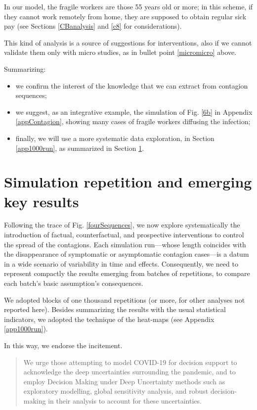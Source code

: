 \documentclass[11pt]{article}
\begin{document}
In our model, the fragile workers are those 55 years old or more; in this scheme, if they cannot work remotely from home, they are supposed to obtain regular sick pay (see Sections \ref{CBanalysis} and \ref{c8} for considerations).

This kind of analysis is a source of suggestions for interventions, also if we cannot validate them only with micro studies, as in bullet point \ref{micromicro} above. 

Summarizing: 

\begin{itemize}
\setlength{\itemsep}{0pt}
\item we confirm the interest of the knowledge that we can extract from contagion sequences; 
\item we suggest, as an integrative example, the simulation of Fig. \ref{6b}  in Appendix \ref{appContagion}, showing many cases of fragile workers diffusing the infection;
\item finally, we will use a more systematic data exploration, in Section \ref{app1000run}, as summarized in Section \ref{keyResultsS}.
\end{itemize}


\section{Simulation repetition and emerging key results}
\label{keyResultsS}

Following the trace of Fig. \ref{fourSequences}, we now explore systematically the introduction of factual, counterfactual, and prospective interventions to control the spread of the contagions. Each simulation run---whose length coincides with the disappearance of symptomatic or asymptomatic contagion cases---is a datum in a wide scenario of variability in time and effects. Consequently, we need to represent compactly the results emerging from batches of repetitions, to compare each batch's basic assumption's consequences.

We adopted blocks of one thousand repetitions (or more, for other analyses not reported here). Besides summarizing the results with the usual statistical indicators, we adopted the technique of the heat-maps (see Appendix \ref{app1000run}). 

In this way, we endorse the \cite{steinmann2020don} incitement.
\begin{quote}
We urge those attempting to model COVID-19 for decision support to acknowledge the deep uncertainties surrounding the pandemic, and to employ Decision Making under Deep Uncertainty methods such as exploratory modelling, global sensitivity analysis, and robust decision-making in their analysis to account for these uncertainties.
\end{quote}
\end{document}
